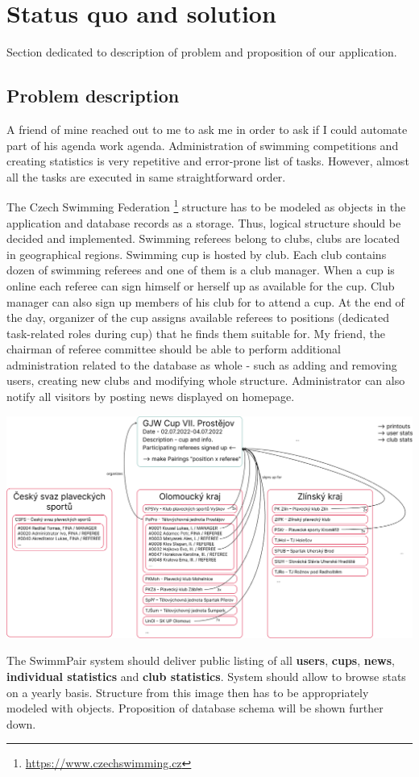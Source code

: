 \chapter{Status quo and solution}
Section dedicated to description of problem and proposition of our application.
\section{Problem description}
\par
A friend of mine reached out to me to ask me in order to ask if I could automate part of his agenda work agenda. Administration of swimming competitions and creating statistics is very repetitive and error-prone list of tasks. However, almost all the tasks are executed in same straightforward order.
\par
The Czech Swimming Federation \footnote{\url{https://www.czechswimming.cz}} structure has to be modeled as objects in the application and database records as a storage. Thus, logical structure should be decided and implemented. Swimming referees belong to clubs, clubs are located in geographical regions. Swimming cup is hosted by club. Each club contains dozen of swimming referees and one of them is a club manager. When a cup is online each referee can sign himself or herself up as available for the cup. Club manager can also sign up members of his club for to attend a cup. At the end of the day, organizer of the cup assigns available referees to positions (dedicated task-related roles during cup) that he finds them suitable for. My friend, the chairman of referee committee should be able to perform additional administration related to the database as whole - such as adding and removing users, creating new clubs and modifying whole structure. Administrator can also notify all visitors by posting news displayed on homepage.
\par
\includegraphics[scale=0.335]{img/swimmpair_schema.png}
\par
The SwimmPair system should deliver public listing of all \textbf{users}, \textbf{cups}, \textbf{news}, \textbf{individual statistics} and \textbf{club statistics}. System should allow to browse stats on a yearly basis. Structure from this image then has to be appropriately modeled with objects. Proposition of database schema will be shown further down. 
